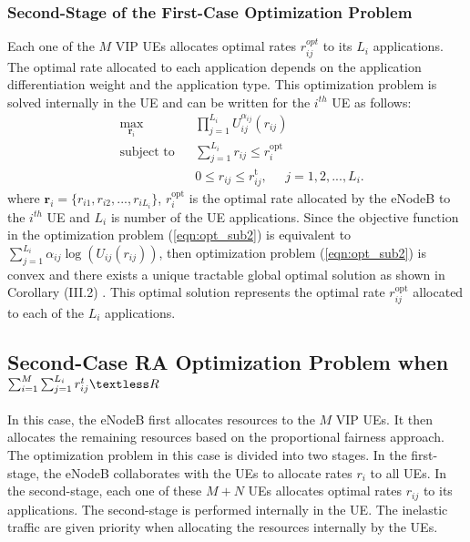 \documentclass[journal]{IEEEtran} 				\IEEEoverridecommandlockouts 						\usepackage{amsmath,amssymb}
\begin{document}
\subsubsection{Second-Stage of the First-Case Optimization Problem}\label{FC-SS-RA}
Each one of the $M$ VIP UEs allocates optimal rates $r_{ij}^{opt}$ to its $L_i$ applications. The optimal rate allocated to each application depends on the application differentiation weight and the application type. This optimization problem is solved internally in the UE and can be written for the $i^{th}$ UE as follows:
\begin{equation}\label{eqn:opt_sub2}
\begin{aligned}
& \underset{\textbf{r}_i}{\text{max}}
& & \prod_{j=1}^{L_i}U_{ij}^{\alpha_{ij}}(r_{ij}) \\
& \text{subject to}
& & \sum_{j=1}^{L_i}r_{ij} \leq r_i^{\text{opt}}\\
& & & 0 \leq r_{ij} \leq r_{ij}^{\text{t}}, \;\;\;\;\; j = 1,2, ...,L_i.
\end{aligned}
\end{equation}
where $\textbf{r}_i =\{r_{i1},r_{i2},...,r_{iL_i}\}$, $r_i^{\text{opt}}$ is the optimal rate allocated by the eNodeB to the $i^{th}$ UE and $L_i$ is number of the UE applications.
Since the objective function in the optimization problem (\ref{eqn:opt_sub2}) is equivalent to $\sum_{j=1}^{L_i}\alpha_{ij} \log(U_{ij}(r_{ij}))$,
then optimization problem (\ref{eqn:opt_sub2}) is convex and there exists a unique tractable global optimal solution as shown in Corollary (III.2) \cite{Ahmed_Utility3}. This optimal solution represents the optimal rate $r_{ij}^{\text{opt}}$ allocated to each of the $L_i$ applications.
\subsection{Second-Case RA Optimization Problem when $\sum_{i=1}^{M}\sum_{j=1}^{L_i}r_{ij}^t\textless R$} \label{Second-Case-RA}
In this case, the eNodeB first allocates resources to the $M$ VIP UEs. It then allocates the remaining resources based on the proportional fairness approach. The optimization problem in this case is divided into two stages. In the first-stage, the eNodeB collaborates with the UEs to allocate rates $r_i$ to all UEs. In the second-stage, each one of these $M+N$ UEs allocates optimal rates $r_{ij}$ to its applications. The second-stage is performed internally in the UE. The inelastic traffic are given priority when allocating the resources internally by the UEs.
\end{document}
